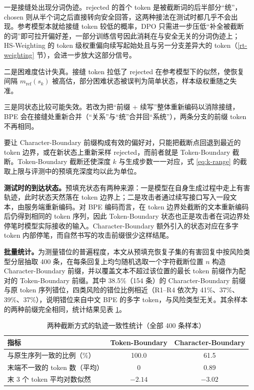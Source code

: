 \documentclass[fontset=fandol,type=master,campus=shenzhen,etitleauto=true]{hithesisbook}
\begin{document}
一是接缝处出现分词伪迹。rejected 的首个 token 是被截断词的后半部分“统”，chosen 则从半个词之后直接转向安全回答，这两种接法在测试时都几乎不会出现。参考模型本就给接缝 token 较低的概率，DPO 只需进一步压低“补全被截断的词”即可拉开偏好差，一部分训练信号因此消耗在与安全无关的分词伪迹上；HS-Weighting 的 token 级权重偏向续写起始处且与另一分支差异大的 token（\ref{rt-weighting} 节），会进一步放大这部分信号。

二是困难度估计失真。接缝 token 拉低了 rejected 在参考模型下的似然，使恢复间隔 $m_{\text{ref}}(s_k)$ 被高估，部分困难状态被误判为简单状态，样本级权重随之失准。

三是同状态比较可能失效。若改为把“前缀 + 续写”整体重新编码以消除接缝，BPE 会在接缝处重新合并（“关系”与“统”合并回“系统”），两条分支的前缀 token 不再相同。

要让 Character-Boundary 前缀构成有效的偏好对，只能把截断点回退到最近的 token 边界，或在新状态上重新采样 rejected，而前者就是 Token-Boundary 截断。Token-Boundary 截断还使深度 $k$ 与生成步数一一对应，式 \eqref{eq:k-range} 的截取上限与评测中的预填充深度均以此为单位。

\textbf{测试时的到达状态。}预填充状态有两种来源：一是模型在自身生成过程中走上有害轨迹，此时状态天然落在 token 边界上；二是攻击者通过续写接口写入一段文本，由服务端重新编码。对 BPE 编码而言，在 token 边界处截断的文本重新编码后仍得到相同的 token 序列，因此 Token-Boundary 状态也正是攻击者在词边界处停笔时模型实际接收的输入。Character-Boundary 额外引入的状态对应在多字 token 内部停笔，而自然书写的攻击前缀很少这样结尾。

\textbf{批量统计。}为测量错位的普遍程度，本文从预填充恢复子集的有害回复中按风险类型分层抽取 400 条，在每条回复上均匀随机选取一个字符截断位置 $n$ 构造 Character-Boundary 前缀，并以覆盖文本不超过该位置的最长 token 前缀作为配对的 Token-Boundary 前缀。其中 38.5\%（154 条）的 Character-Boundary 前缀与原 token 序列错位，四类风险的错位比例相近（R1--R4 依次为 41\%、37\%、39\%、37\%），说明错位来自中文 BPE 的多字 token，与风险类型无关。其余样本的两种前缀完全相同，统计结果见表 \ref{tab:trunc-batch}。

\begin{table}[htbp]
\centering
\caption{两种截断方式的轨迹一致性统计（全部 400 条样本）}
\label{tab:trunc-batch}
\small
\renewcommand{\arraystretch}{1.15}
\begin{tabular}{l c c}
\toprule
\textbf{指标} & \textbf{Token-Boundary} & \textbf{Character-Boundary} \\
\midrule
与原生序列一致的比例（\%） & 100.0 & 61.5 \\
末端不一致的 token 数（平均） & 0 & 0.89 \\
末 3 个 token 平均对数似然 & $-2.14$ & $-3.02$ \\
\bottomrule
\end{tabular}
\end{table}
\end{document}
